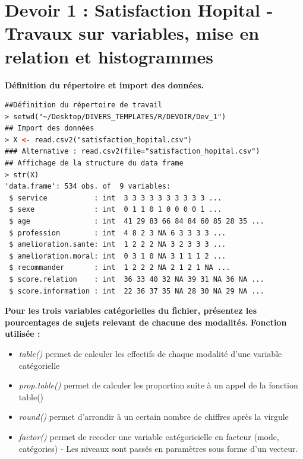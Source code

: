 \section{Devoir 1 : Satisfaction Hopital - Travaux sur variables, mise en relation et histogrammes}
\textbf{Définition du répertoire et import des données.}

\begin{lstlisting}[language=html]
##Définition du répertoire de travail 
> setwd("~/Desktop/DIVERS_TEMPLATES/R/DEVOIR/Dev_1")
## Import des données 
> X <- read.csv2("satisfaction_hopital.csv")
### Alternative : read.csv2(file="satisfaction_hopital.csv")
## Affichage de la structure du data frame
> str(X)
'data.frame': 534 obs. of  9 variables:
 $ service           : int  3 3 3 3 3 3 3 3 3 3 ...
 $ sexe              : int  0 1 1 0 1 0 0 0 0 1 ...
 $ age               : int  41 29 83 66 84 84 60 85 28 35 ...
 $ profession        : int  4 8 2 3 NA 6 3 3 3 3 ...
 $ amelioration.sante: int  1 2 2 2 NA 3 2 3 3 3 ...
 $ amelioration.moral: int  0 3 1 0 NA 3 1 1 1 2 ...
 $ recommander       : int  1 2 2 2 NA 2 1 2 1 NA ...
 $ score.relation    : int  36 33 40 32 NA 39 31 NA 36 NA ...
 $ score.information : int  22 36 37 35 NA 28 30 NA 29 NA ...
\end{lstlisting}

\textbf{Pour les trois variables catégorielles du fichier, présentez les pourcentages de
sujets relevant de chacune des modalités.}\newline
\textbf{Fonction utilisée : }
\begin{itemize}
\item \textit{table()} permet de calculer les effectifs de chaque modalité d'une variable catégorielle
\item \textit{prop.table()} permet de calculer les proportion suite à un appel de la fonction table()
\item \textit{round()} permet d'arrondir à un certain nombre de chiffres après la virgule
\item \textit{factor()} permet de recoder une variable catégoricielle en facteur (mode, catégories) - Les niveaux sont passés en paramètres sous forme d'un vecteur.
\end{itemize}

